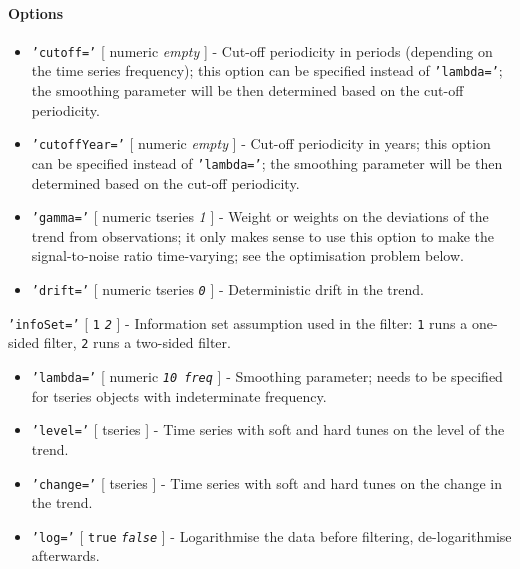  \paragraph{Options}
 
 \begin{itemize}
 \item
   \texttt{'cutoff='} {[} numeric \textbar{} \emph{empty} {]} - Cut-off
   periodicity in periods (depending on the time series frequency); this
   option can be specified instead of \texttt{'lambda='}; the smoothing
   parameter will be then determined based on the cut-off periodicity.
 \item
   \texttt{'cutoffYear='} {[} numeric \textbar{} \emph{empty} {]} -
   Cut-off periodicity in years; this option can be specified instead of
   \texttt{'lambda='}; the smoothing parameter will be then determined
   based on the cut-off periodicity.
 \item
   \texttt{'gamma='} {[} numeric \textbar{} tseries \textbar{} \emph{1}
   {]} - Weight or weights on the deviations of the trend from
   observations; it only makes sense to use this option to make the
   signal-to-noise ratio time-varying; see the optimisation problem
   below.
 \item
   \texttt{'drift='} {[} numeric \textbar{} tseries \textbar{}
   \emph{\texttt{0}} {]} - Deterministic drift in the trend.
 \end{itemize}
 
 \texttt{'infoSet='} {[} \texttt{1} \textbar{} \emph{\texttt{2}} {]} -
 Information set assumption used in the filter: \texttt{1} runs a
 one-sided filter, \texttt{2} runs a two-sided filter.
 
 \begin{itemize}
 \item
   \texttt{'lambda='} {[} numeric \textbar{} \emph{\texttt{10 freq}} {]}
   - Smoothing parameter; needs to be specified for tseries objects with
   indeterminate frequency.
 \item
   \texttt{'level='} {[} tseries {]} - Time series with soft and hard
   tunes on the level of the trend.
 \item
   \texttt{'change='} {[} tseries {]} - Time series with soft and hard
   tunes on the change in the trend.
 \item
   \texttt{'log='} {[} \texttt{true} \textbar{} \emph{\texttt{false}} {]}
   - Logarithmise the data before filtering, de-logarithmise afterwards.
 \end{itemize}
 
